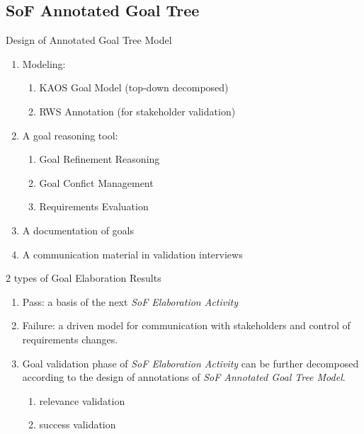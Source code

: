 \documentclass{beamer}
\begin{document}
\subsection{SoF Annotated Goal Tree}
\begin{frame}{Design of Annotated Goal Tree Model}
  \begin{enumerate}
  \item Modeling:
    \begin{enumerate}
    \item KAOS Goal Model \pause (top-down decomposed)
    \item RWS Annotation \pause (for stakeholder validation)
    \end{enumerate}
  \item A goal reasoning tool: 
    \begin{enumerate}
    \item Goal Refinement Reasoning
    \item Goal Confict Management
    \item Requirements Evaluation
    \end{enumerate}
  \item A documentation of goals
  \item A communication material in validation interviews
  \end{enumerate}
\end{frame}  
\begin{frame}{2 types of Goal Elaboration Results}
  \begin{enumerate}
  \item Pass: a basis of the next \emph{SoF Elaboration Activity} \pause
  \item Failure: a driven model for communication with stakeholders and control of requirements changes. \pause
  \item Goal validation phase of \emph{SoF Elaboration Activity} can be further decomposed according to the design of annotations of \emph{SoF Annotated Goal Tree Model}.\pause
    \begin{enumerate}
    \item relevance validation
    \item success validation
    \end{enumerate}
  \end{enumerate}
\end{frame}
\end{document}
